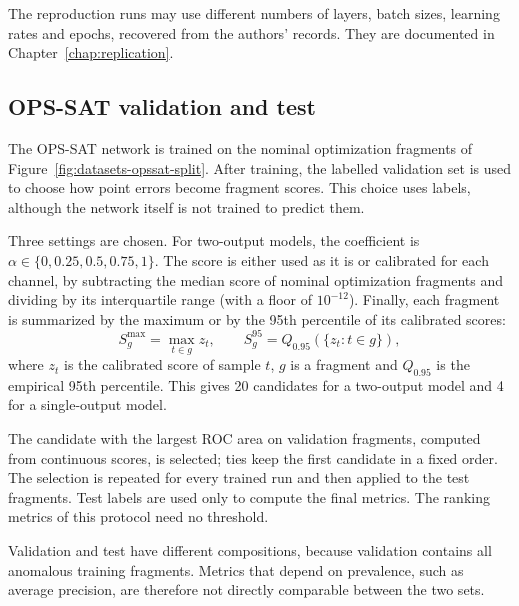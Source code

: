 The reproduction runs may use different numbers of layers, batch sizes,
learning rates and epochs, recovered from the authors' records. They are
documented in Chapter~\ref{chap:replication}.

\subsection{OPS-SAT validation and test}
\label{sec:datasets-opssat-protocol}

The \ac{OPS-SAT} network is trained on the nominal optimization fragments of
Figure~\ref{fig:datasets-opssat-split}. After training, the labelled
validation set is used to choose how point errors become fragment scores.
This choice uses labels, although the network itself is not trained to
predict them.

Three settings are chosen. For two-output models, the coefficient is
\(\alpha\in\{0,0.25,0.5,0.75,1\}\). The score is either used as it is or
calibrated for each channel, by subtracting the median score of nominal
optimization fragments and dividing by its interquartile range (with a
floor of \(10^{-12}\)). Finally, each fragment is summarized by the maximum
or by the \num{95}th percentile of its calibrated scores:
\begin{equation}
  S_g^{\max}=\max_{t\in g} z_t,
  \qquad
  S_g^{95}=Q_{0.95}\!\left(\{z_t:t\in g\}\right),
  \label{eq:datasets-fragment-score}
\end{equation}
where \(z_t\) is the calibrated score of sample \(t\), \(g\) is a fragment
and \(Q_{0.95}\) is the empirical \num{95}th percentile. This gives \num{20}
candidates for a two-output model and \num{4} for a single-output model.

The candidate with the largest \ac{ROC} area on validation fragments,
computed from continuous scores, is selected; ties keep the first candidate
in a fixed order. The selection is repeated for every trained run and then
applied to the test fragments. Test labels are used only to compute the
final metrics. The ranking metrics of this protocol need no threshold.

Validation and test have different compositions, because validation
contains all anomalous training fragments. Metrics that depend on
prevalence, such as average precision, are therefore not directly
comparable between the two sets.

